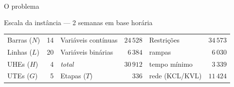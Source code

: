 \documentclass[10pt,aspectratio=169]{beamer}
\begin{document}
\begin{frame}{O problema}
  \vspace{0.3em}
  \begin{block}{Escala da instância --- 2 semanas em base horária}
    \centering\scriptsize
    \begin{tabular}{lr@{\qquad}lr@{\qquad}lr}
      \toprule
      Barras ($N$) & 14  & Variáveis contínuas & $24\,528$ & Restrições         & $34\,573$ \\
      Linhas ($L$) & 20  & Variáveis binárias  & $6\,384$  & \quad rampas       & $6\,030$  \\
      UHEs ($H$)   & 4   & \quad \emph{total}  & $30\,912$ & \quad tempo mínimo & $3\,339$  \\
      UTEs ($G$)   & 5   & Etapas ($T$)        & 336       & \quad rede (KCL/KVL) & $11\,424$ \\
      \bottomrule
    \end{tabular}
  \end{block}
\end{frame}
\end{document}
